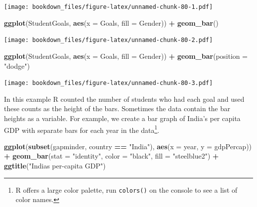 \documentclass[
]{krantz}
\makeatletter
\newenvironment{Shaded}{\begin{snugshade}}{\end{snugshade}}
\newcommand{\DataTypeTok}[1]{\textcolor[rgb]{0.27,0.27,0.27}{#1}}
\newcommand{\KeywordTok}[1]{\textcolor[rgb]{0.27,0.27,0.27}{\textbf{#1}}}
\newcommand{\NormalTok}[1]{#1}
\newcommand{\OperatorTok}[1]{\textcolor[rgb]{0.43,0.43,0.43}{\textbf{#1}}}
\newcommand{\StringTok}[1]{\textcolor[rgb]{0.5,0.5,0.5}{#1}}
\newenvironment{kframe}{%
\medskip{}
\setlength{\fboxsep}{.8em}
 \def\at@end@of@kframe{}%
 \ifinner\ifhmode%
  \def\at@end@of@kframe{\end{minipage}}%
  \begin{minipage}{\columnwidth}%
 \fi\fi%
 \def\FrameCommand##1{\hskip\@totalleftmargin \hskip-\fboxsep
 \colorbox{shadecolor}{##1}\hskip-\fboxsep
     \hskip-\linewidth \hskip-\@totalleftmargin \hskip\columnwidth}%
 \MakeFramed {\advance\hsize-\width
   \@totalleftmargin\z@ \linewidth\hsize
   \@setminipage}}%
 {\par\unskip\endMakeFramed%
 \at@end@of@kframe}
\renewenvironment{Shaded}{\begin{kframe}}{\end{kframe}}
\makeatother
\begin{document}
\texttt{[image: bookdown\_files/figure-latex/unnamed-chunk-80-1.pdf]}

\begin{Shaded}
\begin{Highlighting}[]
\KeywordTok{ggplot}\NormalTok{(StudentGoals, }\KeywordTok{aes}\NormalTok{(}\DataTypeTok{x =}\NormalTok{ Goals, }\DataTypeTok{fill =}\NormalTok{ Gender)) }\OperatorTok{+}\StringTok{ }\KeywordTok{geom\_bar}\NormalTok{()}
\end{Highlighting}
\end{Shaded}

\texttt{[image: bookdown\_files/figure-latex/unnamed-chunk-80-2.pdf]}

\begin{Shaded}
\begin{Highlighting}[]
\KeywordTok{ggplot}\NormalTok{(StudentGoals, }\KeywordTok{aes}\NormalTok{(}\DataTypeTok{x =}\NormalTok{ Goals, }\DataTypeTok{fill =}\NormalTok{ Gender)) }\OperatorTok{+}\StringTok{ }
\StringTok{    }\KeywordTok{geom\_bar}\NormalTok{(}\DataTypeTok{position =} \StringTok{"dodge"}\NormalTok{)}
\end{Highlighting}
\end{Shaded}

\texttt{[image: bookdown\_files/figure-latex/unnamed-chunk-80-3.pdf]}

In this example R counted the number of students who had each goal and used these counts as the height of the bars. Sometimes the data contain the bar heights as a variable. For example, we create a bar graph of India's per capita GDP with separate bars for each year in the data\footnote{R offers a large color palette, run \texttt{colors()} on the console to see a list of color names.}.

\begin{Shaded}
\begin{Highlighting}[]
\KeywordTok{ggplot}\NormalTok{(}\KeywordTok{subset}\NormalTok{(gapminder, country }\OperatorTok{==}\StringTok{ "India"}\NormalTok{), }\KeywordTok{aes}\NormalTok{(}\DataTypeTok{x =}\NormalTok{ year, }\DataTypeTok{y =}\NormalTok{ gdpPercap)) }\OperatorTok{+}\StringTok{ }
\StringTok{    }\KeywordTok{geom\_bar}\NormalTok{(}\DataTypeTok{stat =} \StringTok{"identity"}\NormalTok{, }\DataTypeTok{color =} \StringTok{"black"}\NormalTok{, }\DataTypeTok{fill =} \StringTok{"steelblue2"}\NormalTok{) }\OperatorTok{+}\StringTok{ }
\StringTok{    }\KeywordTok{ggtitle}\NormalTok{(}\StringTok{"India\textquotesingle{}s per{-}capita GDP"}\NormalTok{)}
\end{Highlighting}
\end{Shaded}
\end{document}

